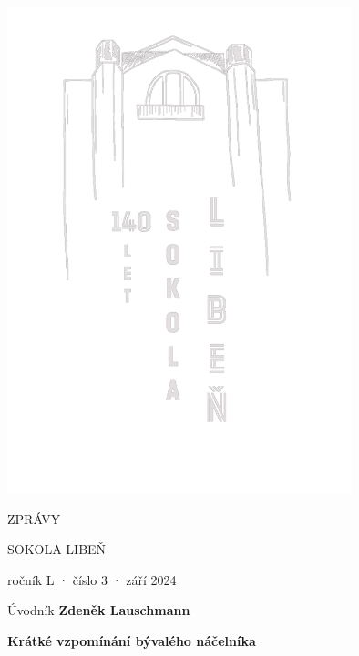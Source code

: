 \documentclass[11pt]{article}
\begin{document}
\pagecolor{sokolred}
\color{white}
\begin{center}

\vspace*{\fill}

\includegraphics*[width=0.75\textwidth]{logo-140-vert-white.pdf}

{\titlesize \fugner ZPRÁVY}

{\titlesize \tyrs SOKOLA LIBEŇ}

\vspace*{1cm}

{\large ročník L · číslo 3 · září 2024}

\vspace*{\fill}
\end{center}

\clearpage
\normalcolor
\nopagecolor
{}

\pagestyle{uvodnik}


{\fontsize{48pt}{57pt} \fugner \color{sokolred} \noindent Úvodník}
\hfill
{\textbf{Zdeněk Lauschmann}} %


\vspace*{12pt}
\begin{center}
  \textbf{Krátké vzpomínání bývalého náčelníka}
\end{center}
\end{document}
